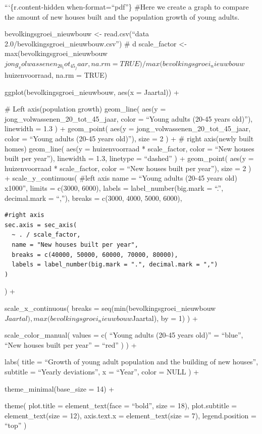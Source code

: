 \documentclass[
]{article}
\begin{document}
```\{r.content-hidden when-format=``pdf''\} \#Here we create a graph to
compare the amount of new houses built and the population growth of
young adults.

bevolkingsgroei\_nieuwbouw \textless- read.csv(``data
2.0/bevolkingsgroei\_nieuwbouw.csv'') \# d scale\_factor \textless-
max(bevolkingsgroei\_nieuwbouw\(jong_volwassenen_20_tot_45_jaar, na.rm = TRUE) /
                max(bevolkingsgroei_nieuwbouw\)huizenvoorraad, na.rm =
TRUE)

ggplot(bevolkingsgroei\_nieuwbouw, aes(x = Jaartal)) +

\# Left axis(population growth) geom\_line( aes(y =
jong\_volwassenen\_20\_tot\_45\_jaar, color = ``Young adults (20-45
years old)''), linewidth = 1.3 ) + geom\_point( aes(y =
jong\_volwassenen\_20\_tot\_45\_jaar, color = ``Young adults (20-45
years old)''), size = 2 ) + \# right axis(newly built homes) geom\_line(
aes(y = huizenvoorraad * scale\_factor, color = ``New houses built per
year''), linewidth = 1.3, linetype = ``dashed'' ) + geom\_point( aes(y =
huizenvoorraad * scale\_factor, color = ``New houses built per year''),
size = 2 ) + scale\_y\_continuous( \#left axis name = ``Young adults
(20-45 years old) x1000'', limits = c(3000, 6000), labels =
label\_number(big.mark = ``.'', decimal.mark = ``,''), breaks = c(3000,
4000, 5000, 6000),

\begin{verbatim}
#right axis
sec.axis = sec_axis(
  ~ . / scale_factor,
  name = "New houses built per year",
  breaks = c(40000, 50000, 60000, 70000, 80000),
  labels = label_number(big.mark = ".", decimal.mark = ",")
)
\end{verbatim}

) +

scale\_x\_continuous( breaks =
seq(min(bevolkingsgroei\_nieuwbouw\(Jaartal),
                 max(bevolkingsgroei_nieuwbouw\)Jaartal), by = 1) ) +

scale\_color\_manual( values = c( ``Young adults (20-45 years old)'' =
``blue'', ``New houses built per year'' = ``red'' ) ) +

labs( title = ``Growth of young adult population and the building of new
houses'', subtitle = ``Yearly deviations'', x = ``Year'', color = NULL )
+

theme\_minimal(base\_size = 14) +

theme( plot.title = element\_text(face = ``bold'', size = 18),
plot.subtitle = element\_text(size = 12), axis.text.x =
element\_text(size = 7), legend.position = ``top'' )
\end{document}
